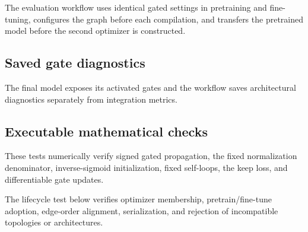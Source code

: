 \documentclass[11pt]{article}
\begin{document}
The evaluation workflow uses identical gated settings in pretraining and
fine-tuning, configures the graph before each compilation, and transfers the
pretrained model before the second optimizer is constructed.



\subsection{Saved gate diagnostics}

The final model exposes its activated gates and the workflow saves architectural
diagnostics separately from integration metrics.



\subsection{Executable mathematical checks}

These tests numerically verify signed gated propagation, the fixed normalization
denominator, inverse-sigmoid initialization, fixed self-loops, the keep loss,
and differentiable gate updates.



The lifecycle test below verifies optimizer membership, pretrain/fine-tune
adoption, edge-order alignment, serialization, and rejection of incompatible
topologies or architectures.


\end{document}
